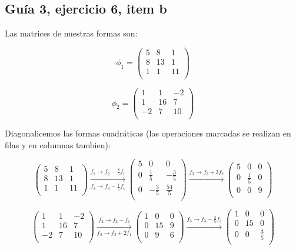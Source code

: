\documentclass[12pt]{amsart}
\newcommand{\lp}{\left(}
\newcommand{\rp}{\right)}
\theoremstyle{plain}
\begin{document}
\subsection*{Guía 3, ejercicio 6, item b}

Las matrices de nuestras formas son:

\begin{multicols}{2}
$$\phi_1 = \lp
\begin{matrix}
    5&8&1 \\
    8&13&1 \\
    1&1&11 \\
\end{matrix}\rp$$

$$\phi_2 = \lp
\begin{matrix}
    1&1&-2 \\
    1&16&7 \\
    -2&7&10 \\
\end{matrix}\rp$$
\end{multicols}

Diagonalicemos las formas cuadráticas (las operaciones 
marcadas se realizan en filas y en columnas tambien):

$$
\lp\begin{matrix}
    5&8&1 \\
    8&13&1 \\
    1&1&11 \\
\end{matrix}\rp
\xrightarrow[f_3 \to f_3-\frac{1}{5}f_1]{f_2 \to f_2-
\frac{8}{5}f_1}
\lp\begin{matrix}
    5&0&0 \\
    0&\frac{1}{5}&-\frac{3}{5} \\
    0&-\frac{3}{5}&\frac{54}{5} \\
\end{matrix}\rp
\xrightarrow{f_3 \to f_3+3f_2}
\lp\begin{matrix}
    5&0&0 \\
    0&\frac{1}{5}&0 \\
    0&0&9 \\
\end{matrix}\rp
$$

$$
\lp\begin{matrix}
    1&1&-2 \\
    1&16&7 \\
    -2&7&10 \\
\end{matrix}\rp
\xrightarrow[f_3 \to f_3+2f_1]{f_2 \to f_2-f_1}
\lp\begin{matrix}
    1&0&0 \\
    0&15&9 \\
    0&9&6 \\
\end{matrix}\rp
\xrightarrow{f_3 \to f_3-\frac{3}{5}f_2}
\lp\begin{matrix}
    1&0&0 \\
    0&15&0 \\
    0&0&\frac{3}{5} \\
\end{matrix}\rp
$$
\end{document}
